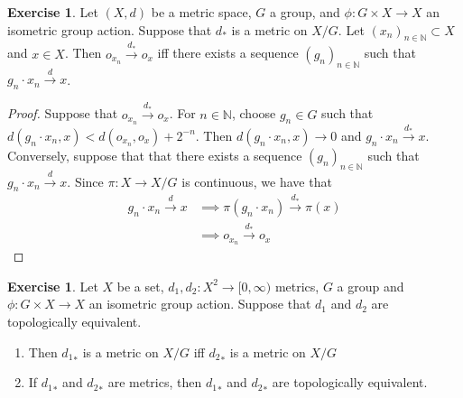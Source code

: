 \documentclass[12pt]{amsart}
\theoremstyle{definition}
\newtheorem{ex}[definition]{Exercise}
\newcommand{\N}{\mathbb{N}}
\newcommand{\Rg}{[0,\infty)}
\newcommand{\conv}[1]{\xrightarrow{#1}}
\begin{document}
	\begin{ex}
	Let $(X, d)$ be a metric space, $G$ a group, and $\phi: G \times X \rightarrow X$ an isometric group action. Suppose that $d_*$ is a metric on $X/G$. Let $(x_n)_{n \in \N} \subset X$ and $x \in X$. Then $o_{x_n} \conv{d_*} o_x$ iff there exists a sequence $(g_n)_{n \in \N}$ such that $g_n \cdot x_n \conv{d} x$.
	\end{ex}
	
	\begin{proof} 
	Suppose that $o_{x_n} \conv{d_*} o_x$. For $n \in \N$, choose $g_n \in G$ such that $d(g_n \cdot x_n, x) < d(o_{x_n}, o_x) + 2^{-n}$. Then $d(g_n \cdot x_n, x) \rightarrow 0$ and $g_n \cdot x_n \conv{d_*} x$.  \\
	Conversely, suppose that that there exists a sequence $(g_n)_{n \in \N}$ such that $g_n \cdot x_n \conv{d} x$. Since $\pi:X \rightarrow X/G$ is continuous, we have that
	\begin{align*}
	g_n \cdot x_n \conv{d} x
	& \implies \pi(g_n \cdot x_n) \conv{d_*} \pi(x)\\
	& \implies o_{x_n}  \conv{d_*} o_x
	\end{align*}
	\end{proof}		
	
	\begin{ex}
	Let $X$ be a set, $d_1, d_2: X^2 \rightarrow \Rg$ metrics, $G$ a group and $\phi: G \times X \rightarrow X$ an isometric group action. Suppose that $d_1$ and $d_2$ are topologically equivalent. 
	\begin{enumerate}
	\item Then ${d_1}_*$ is a metric on $X/G$ iff ${d_2}_*$ is a metric on $X/G$
	\item If ${d_1}_*$ and ${d_2}_*$ are metrics, then ${d_1}_*$ and ${d_2}_*$ are topologically equivalent. 
	\end{enumerate}
	\end{ex}
	
\end{document}
